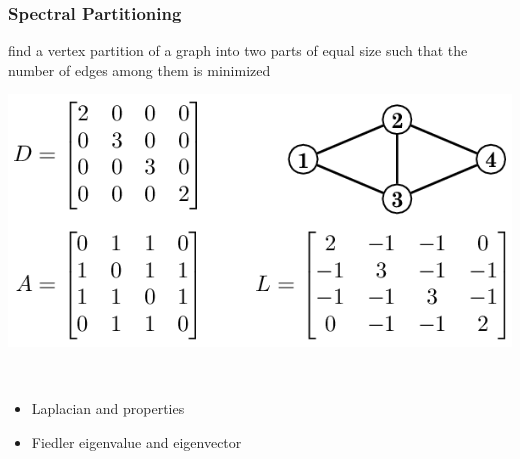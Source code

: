\documentclass[titlepage,german,presentation]{beamer}
\begin{document}
\begin{frame}
  \frametitle{Spectral Partitioning}
  \begin{block}{}
 find a vertex partition of a graph into two parts of equal size such that the number of edges among them is minimized
    \end{block}
\begin{center}
\includegraphics[height=0.3\textwidth]{laplacian-2}\qquad \qquad
\end{center}
~\\
\begin{itemize}
\item Laplacian and properties~\cite{Bichot2013} %
\item Fiedler eigenvalue and eigenvector~\cite{Fiedler73}
\end{itemize}

\end{frame}
\end{document}
